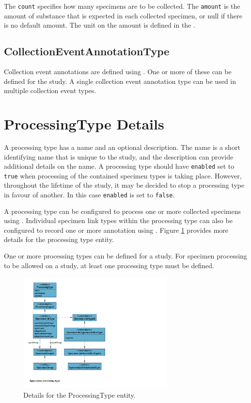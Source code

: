 The \texttt{count} specifies how many specimens are to be collected. The
\texttt{amount} is the amount of substance that is expected in each collected
specimen, or null if there is no default amount. The unit on the amount is
defined in the .

\subsection*{CollectionEventAnnotationType}

Collection event annotations are defined using
. One or more of these can be
defined for the study. A single collection event annotation type can be used in
multiple collection event types.

\section{ProcessingType Details}
\label{sec:processing-type}

A processing type has a name and an optional description. The name is a short
identifying name that is unique to the study, and the description can provide
additional details on the name. A processing type should have \texttt{enabled}
set to \texttt{true} when processing of the contained specimen types is taking
place. However, throughout the lifetime of the study, it may be decided to stop
a processing type in favour of another. In this case \texttt{enabled} is set to
\texttt{false}.

A processing type can be configured to process one or more collected specimens
using . Individual specimen link types within the
processing type can also be configured to record one or more annotation using
. Figure \ref{fig:processing-type}
provides more details for the processing type entity.

One or more processing types can be defined for a study. For specimen
processing to be allowed on a study, at least one processing type must be
defined.

\begin{figure}[H]
  \centering
  \includegraphics[trim={9mm 35mm 120mm 9mm}, clip,
    width=0.7\textwidth]{images/processing-type}
  \caption{Details for the ProcessingType entity.}
  \label{fig:processing-type}
\end{figure}

